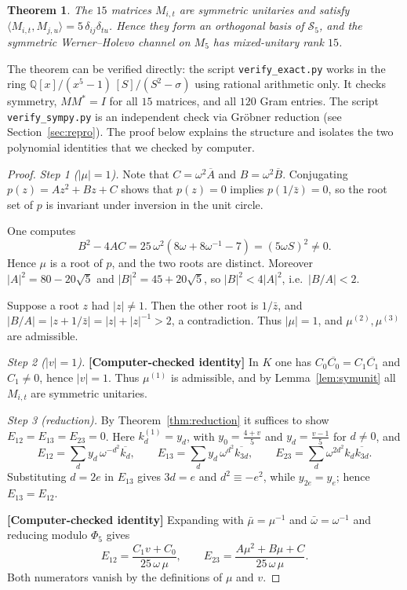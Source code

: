 \documentclass[11pt]{amsart}
\newtheorem{theorem}{Theorem}
\theoremstyle{definition}
\theoremstyle{remark}
\newcommand{\Q}{\mathbb{Q}}
\newcommand{\Sym}{\mathcal{S}}
\newcommand{\ip}[2]{\langle #1,#2\rangle}
\begin{document}
\begin{theorem}\label{thm:n5}
The $15$ matrices $M_{i,t}$ are symmetric unitaries and satisfy $\ip{M_{i,t}}{M_{j,u}}=5\,\delta_{ij}\delta_{tu}$. Hence they form an orthogonal basis of $\Sym_5$, and the symmetric Werner--Holevo channel on $M_5$ has mixed-unitary rank $15$.
\end{theorem}

The theorem can be verified directly: the script \texttt{verify\_exact.py} works in the ring $\Q[x]/(x^5-1)\,[S]/(S^2-\sigma)$ using rational arithmetic only. It checks symmetry, $MM^*=I$ for all $15$ matrices, and all $120$ Gram entries. The script \texttt{verify\_sympy.py} is an independent check via Gr\"obner reduction (see Section~\ref{sec:repro}).
The proof below explains the structure and isolates the two polynomial identities that we checked by computer.

\begin{proof}
\emph{Step 1 ($|\mu|=1$).} Note that $C=\omega^2\overline A$ and $B=\omega^2\overline B$. Conjugating $p(z)=Az^2+Bz+C$ shows that $p(z)=0$ implies $p(1/\bar z)=0$, so the root set of $p$ is invariant under inversion in the unit circle.

One computes
\[
B^2-4AC=25\,\omega^2(8\omega+8\omega^{-1}-7)=(5\omega S)^2\ne0 .
\]
Hence $\mu$ is a root of $p$, and the two roots are distinct. Moreover $|A|^2=80-20\sqrt5$ and $|B|^2=45+20\sqrt5$, so $|B|^2<4|A|^2$, i.e.\ $|B/A|<2$.

Suppose a root $z$ had $|z|\ne1$. Then the other root is $1/\bar z$, and $|B/A|=|z+1/\bar z|=|z|+|z|^{-1}>2$, a contradiction. Thus $|\mu|=1$, and $\mu^{(2)},\mu^{(3)}$ are admissible.

\emph{Step 2 ($|v|=1$).} \textbf{[Computer-checked identity]} In $K$ one has $C_0\overline{C_0}=C_1\overline{C_1}$ and $C_1\ne0$, hence $|v|=1$. Thus $\mu^{(1)}$ is admissible, and by Lemma~\ref{lem:symunit} all $M_{i,t}$ are symmetric unitaries.

\emph{Step 3 (reduction).} By Theorem~\ref{thm:reduction} it suffices to show $E_{12}=E_{13}=E_{23}=0$. Here $k^{(1)}_d=y_d$, with $y_0=\frac{4+v}{5}$ and $y_d=\frac{v-1}5$ for $d\ne0$, and
\[
E_{12}=\sum_d y_d\,\omega^{-d^2}\overline{k_d},\qquad
E_{13}=\sum_d y_d\,\omega^{d^2}\overline{k_{3d}},\qquad
E_{23}=\sum_d\omega^{2d^2}k_d\overline{k_{3d}} .
\]
Substituting $d=2e$ in $E_{13}$ gives $3d=e$ and $d^2\equiv-e^2$, while $y_{2e}=y_e$; hence $E_{13}=E_{12}$.

\textbf{[Computer-checked identity]} Expanding with $\bar\mu=\mu^{-1}$ and $\bar\omega=\omega^{-1}$ and reducing modulo $\Phi_5$ gives
\[
E_{12}=\frac{C_1v+C_0}{25\,\omega\,\mu},\qquad E_{23}=\frac{A\mu^2+B\mu+C}{25\,\omega\,\mu}.
\]
Both numerators vanish by the definitions of $\mu$ and $v$.
\end{proof}
\end{document}

